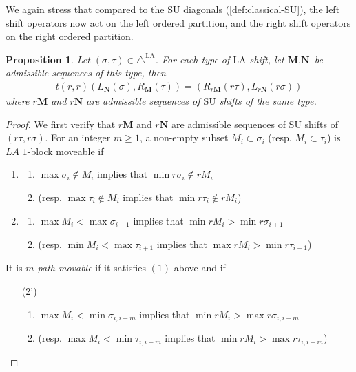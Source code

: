 \documentclass{amsart}
\newtheorem{proposition}[theorem]{Proposition}
\theoremstyle{definition}
\newcommand{\SU}{\mathrm{SU}}
\newcommand{\LA}{\mathrm{LA}}
\newcommand{\LAD}{\triangle^{\mathrm{LA}}}
\begin{document}
We again stress that compared to the $\SU$ diagonals (\cref{def:classical-SU}), the left shift operators now act on the left ordered partition, and the right shift operators on the right ordered partition.

\begin{proposition}
Let $(\sigma,\tau) \in \LAD$.
For each type of $\LA$ shift, let $\textbf{M},\textbf{N}$ be admissible sequences of this type, then 
\begin{align*}
    t(r,r)(L_\mathbf{N}(\sigma), R_\mathbf{M}(\tau)) = (R_{r\mathbf{M}}(r\tau), L_{r\mathbf{N}}(r\sigma))
\end{align*}
where $r\mathbf{M}$ and $r\mathbf{N}$ are admissible sequences of $\SU$ shifts of the same type.
\end{proposition}
\begin{proof}
We first verify that $r\mathbf{M}$ and $r\mathbf{N}$ are admissible sequences of $\SU$ shifts of $(r\tau,r\sigma)$.
For an integer $m\geq 1$, a non-empty subset $M_i \subset \sigma_i$ (resp. $M_{i}\subset \tau_{i}$) is $LA$ $1$-block moveable if
\begin{enumerate}
    \item 
    \begin{enumerate}
        \item $\max \sigma_i \notin M_i$ implies that $ \min r\sigma_i \not \in r M_i$
        \item (resp. $\max \tau_{i} \notin M_i$ implies that  $ \min r\tau_{i} \not \in r M_i$)
    \end{enumerate}
    \item 
    \begin{enumerate}
        \item $\max M_i < \max \sigma_{i-1}$  implies that $\min r M_i > \min r \sigma_{i+1}$
        \item (resp. $\min M_{i} < \max \tau_{i+1}$ implies that $\max rM_{i} > \min r\tau_{i+1}$)
    \end{enumerate}
\end{enumerate}
It is \emph{$m$-path movable} if it satisfies $(1)$ above and if
\begin{enumerate}
    \item[(2')] 
    \begin{enumerate}
        \item $\max M_i < \min \sigma_{i,i-m}$ implies that $\min r M_i > \max r \sigma_{i,i-m}$
        \item (resp. $\max M_{i} < \min \tau_{i,i+m}$ implies that $\min r M_{i} > \max r\tau_{i,i+m}$)

\end{enumerate}
\end{enumerate}
\end{proof}
\end{document}
